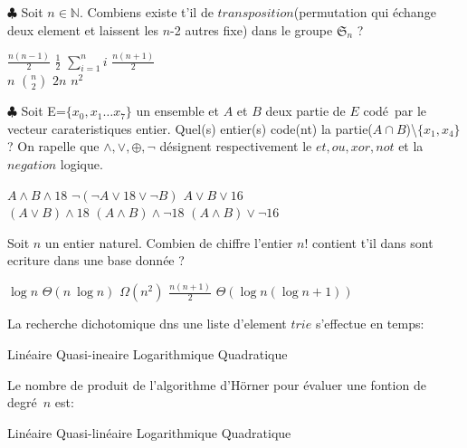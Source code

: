 \documentclass[addpoints]{exam}
\newcommand{\e}{\'{e}}
\begin{document}
\begin{questions}
\question
$\clubsuit$ Soit $n\in \mathbb{N} $. Combiens existe t'il de $transposition$(permutation qui \e change deux element et laissent les $n$-2 autres fixe) dans le groupe $\mathfrak{S}_n$ ? 

\begin{oneparchoices}
\CorrectChoice $\frac{n(n-1)}{2}$
\choice $\frac{1}{2}$
\choice $\sum_{i=1}^{n}i$
\choice $\frac{n(n+1)}{2}$
\\
\choice  $n$
\CorrectChoice $\binom{n}{2}$
\choice $2n$
\choice $n^2$
\end{oneparchoices}

\question
$\clubsuit$ Soit E=$\{x_0,x_1\ldots x_7\}$ un ensemble et $A$ et $B$  deux partie de $E$ cod\e\  par le vecteur carateristiques entier. Quel(s) entier(s) code(nt) la partie($A\cap B$)\textbackslash $\{x_1,x_4\}$ ? On rapelle que $\wedge, \lor, \oplus, \lnot$ d\'{e}signent respectivement le $et, ou, xor, not$ et la $negation$ logique.

\begin{oneparchoices}
\choice $A\wedge B\wedge 18$
\choice $\lnot (\lnot A\lor 18\lor \lnot B)$
\choice $A\lor B\lor 16$
\\
\choice $(A\lor B)\land 18$
\choice $(A\land B)\land \lnot 18$
\CorrectChoice $(A\land B)\lor \lnot 16$
\end{oneparchoices}

\question
Soit $n$ un entier naturel. Combien de chiffre l'entier $n!$ contient t'il  dans sont ecriture dans une base donn\e e ?

\begin{oneparchoices}
\choice $\log n$
\CorrectChoice $\Theta (n\ \log n)$
\choice $\Omega (n^2)$
\choice $\frac{n(n+1)}{2}$
\choice $\Theta (\log n(\log n+1))$
\end{oneparchoices}

\question
La recherche dichotomique dns une liste d'element $trie$ s'effectue en temps:

\begin{oneparchoices}
\choice Lin\e aire
\choice Quasi-ineaire
\CorrectChoice Logarithmique
\choice Quadratique
\end{oneparchoices}

\question
Le nombre de produit de l'algorithme d'H\"orner pour \e valuer une fontion de degr\e \ $n$ est:

\begin{oneparchoices}
\CorrectChoice Lin\e aire
\choice Quasi-lin\e aire
\choice Logarithmique
\choice Quadratique
\end{oneparchoices}


\end{questions}
\end{document}

